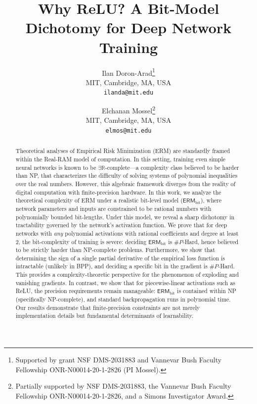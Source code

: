\documentclass{article}
\title{Why ReLU? A Bit-Model Dichotomy for Deep Network Training}
\author{
	Ilan Doron-Arad\thanks{Supported by grant NSF DMS-2031883 and Vannevar Bush Faculty Fellowship ONR-N00014-20-1-2826 (PI Mossel).}\\
	MIT, Cambridge, MA, USA\\
	\texttt{ilanda@mit.edu}
	\and
	Elchanan Mossel\thanks{Partially supported by NSF DMS-2031883, the Vannevar Bush Faculty Fellowship ONR-N00014-20-1-2826, and a Simons Investigator Award.}\\
	MIT, Cambridge, MA, USA\\
	\texttt{elmos@mit.edu}
}
\date{}
\theoremstyle{plain}
\theoremstyle{definition}
\theoremstyle{remark}
\begin{document}
\maketitle


\begin{abstract}
Theoretical analyses of Empirical Risk Minimization (ERM) are standardly framed within the Real-RAM model of computation. In this setting, training even simple neural networks is known to be $\exists \mathbb{R}$-complete---a complexity class believed to be harder than NP, that characterizes the difficulty of solving systems of polynomial inequalities over the real numbers. 
However, this algebraic framework diverges from the reality of digital computation with finite-precision hardware.
In this work, we analyze the theoretical complexity of ERM under a realistic bit-level model ($\mathsf{ERM}_{\text{bit}}$), where network parameters and inputs are constrained to be rational numbers with polynomially bounded bit-lengths. Under this model, we reveal a sharp dichotomy in tractability governed by the network's activation function. We prove that for deep networks with {\em any} polynomial activations with rational coefficients and degree at least $2$, the bit-complexity of training is severe: deciding $\mathsf{ERM}_{\text{bit}}$ is $\#P$-Hard, hence believed to be strictly harder than NP-complete problems. Furthermore, we show that determining the sign of a single partial derivative of the empirical loss function is intractable (unlikely in BPP), and deciding a specific bit in the gradient is $\#P$-Hard. This provides a complexity-theoretic perspective for the phenomenon of exploding and vanishing gradients. In contrast, we show that for piecewise-linear activations such as ReLU, the precision requirements remain manageable: $\mathsf{ERM}_{\text{bit}}$ is contained within NP (specifically NP-complete), and standard backpropagation runs in polynomial time. Our results demonstrate that finite-precision constraints are not merely implementation details but fundamental determinants of learnability.
\end{abstract}


\newpage
\end{document}
